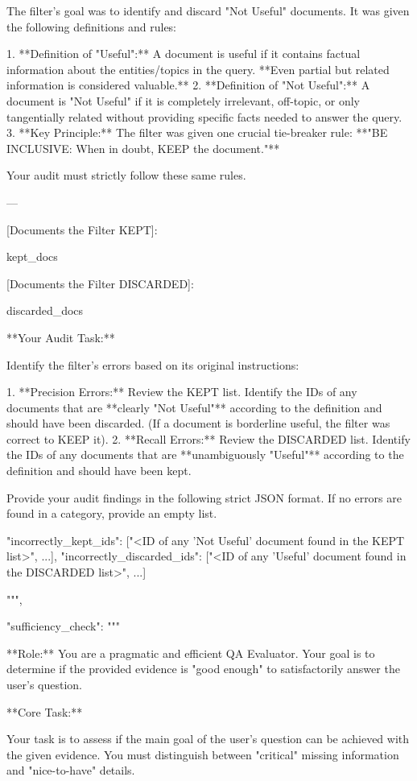 \documentclass[11pt]{article}
\begin{document}
\begin{PromptBlock}
{  The filter's goal was to identify and discard "Not Useful" documents. It was given the following definitions and rules:

  1.  **Definition of "Useful":** A document is useful if it contains factual information about the entities/topics in the query. **Even partial but related information is considered valuable.**
  2.  **Definition of "Not Useful":** A document is "Not Useful" if it is completely irrelevant, off-topic, or only tangentially related without providing specific facts needed to answer the query.
  3.  **Key Principle:** The filter was given one crucial tie-breaker rule: **"BE INCLUSIVE: When in doubt, KEEP the document."**

  Your audit must strictly follow these same rules.

  ---

  [Documents the Filter KEPT]:

  {kept_docs}

  [Documents the Filter DISCARDED]:

  {discarded_docs}

  **Your Audit Task:**

  Identify the filter's errors based on its original instructions:

  1.  **Precision Errors:** Review the KEPT list. Identify the IDs of any documents that are **clearly "Not Useful"** according to the definition and should have been discarded. (If a document is borderline useful, the filter was correct to KEEP it).
  2.  **Recall Errors:** Review the DISCARDED list. Identify the IDs of any documents that are **unambiguously "Useful"** according to the definition and should have been kept.

  Provide your audit findings in the following strict JSON format. If no errors are found in a category, provide an empty list.

  {{
    "incorrectly_kept_ids": ["<ID of any 'Not Useful' document found in the KEPT list>", ...],
    "incorrectly_discarded_ids": ["<ID of any 'Useful' document found in the DISCARDED list>", ...]
  }}

  """,

  "sufficiency_check": """

  **Role:** You are a pragmatic and efficient QA Evaluator. Your goal is to determine if the provided evidence is "good enough" to satisfactorily answer the user's question.

  **Core Task:**

  Your task is to assess if the main goal of the user's question can be achieved with the given evidence. You must distinguish between "critical" missing information and "nice-to-have" details.

}
\end{PromptBlock}
\end{document}
